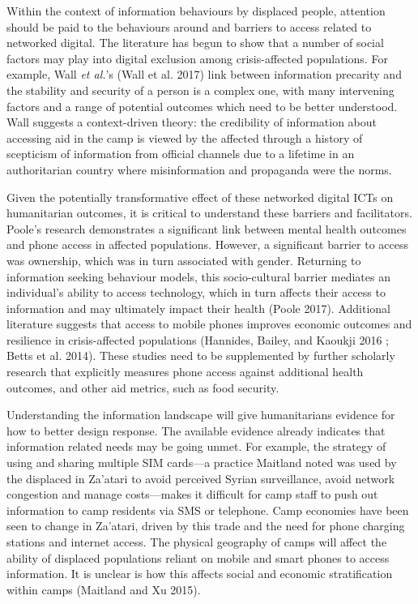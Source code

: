 \documentclass[
]{article}
\begin{document}
Within the context of information behaviours by displaced people,
attention should be paid to the behaviours around and barriers to access
related to networked digital. The literature has begun to show that a
number of social factors may play into digital exclusion among
crisis-affected populations. For example, Wall \emph{et al.}'s (Wall et
al. 2017) link between information precarity and the stability and
security of a person is a complex one, with many intervening factors and
a range of potential outcomes which need to be better understood. Wall
suggests a context-driven theory: the credibility of information about
accessing aid in the camp is viewed by the affected through a history of
scepticism of information from official channels due to a lifetime in an
authoritarian country where misinformation and propaganda were the
norms.

Given the potentially transformative effect of these networked digital
ICTs on humanitarian outcomes, it is critical to understand these
barriers and facilitators. Poole's research demonstrates a significant
link between mental health outcomes and phone access in affected
populations. However, a significant barrier to access was ownership,
which was in turn associated with gender. Returning to information
seeking behaviour models, this socio-cultural barrier mediates an
individual's ability to access technology, which in turn affects their
access to information and may ultimately impact their health (Poole
2017). Additional literature suggests that access to mobile phones
improves economic outcomes and resilience in crisis-affected populations
(Hannides, Bailey, and Kaoukji 2016 ; Betts et al. 2014). These studies
need to be supplemented by further scholarly research that explicitly
measures phone access against additional health outcomes, and other aid
metrics, such as food security.

Understanding the information landscape will give humanitarians evidence
for how to better design response. The available evidence already
indicates that information related needs may be going unmet. For
example, the strategy of using and sharing multiple SIM cards---a
practice Maitland noted was used by the displaced in Za'atari to avoid
perceived Syrian surveillance, avoid network congestion and manage
costs---makes it difficult for camp staff to push out information to
camp residents via SMS or telephone. Camp economies have been seen to
change in Za'atari, driven by this trade and the need for phone charging
stations and internet access. The physical geography of camps will
affect the ability of displaced populations reliant on mobile and smart
phones to access information. It is unclear is how this affects social
and economic stratification within camps (Maitland and Xu 2015).
\end{document}
